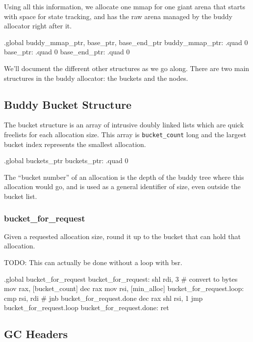 Using all this information, we allocate one mmap for one giant arena that
starts with space for state tracking, and has the raw arena managed by the
buddy allocator right after it.

\begin{asmdata}
.global buddy_mmap_ptr, base_ptr, base_end_ptr
buddy_mmap_ptr: .quad 0
base_ptr: .quad 0
base_end_ptr: .quad 0
\end{asmdata}

We'll document the different other structures as we go along.  There are two
main structures in the buddy allocator: the buckets and the nodes.

\subsection{Buddy Bucket Structure}

The bucket structure is an array of intrusive doubly linked lists which are
quick freelists for each allocation size. This array
is \lstinline|bucket_count| long and the largest bucket index represents the
smallest allocation.

\begin{asmdata}
.global buckets_ptr
buckets_ptr: .quad 0
\end{asmdata}

The ``bucket number'' of an allocation is the depth of the buddy tree where
this allocation would go, and is used as a general identifier of size, even
outside the bucket list.

\subsubsection{bucket\_for\_request}

Given a requested allocation size, round it up to the bucket that can hold that
allocation.

TODO: This can actually be done without a loop with bsr.

\begin{asm}
.global bucket_for_request
bucket_for_request:
	shl	rdi, 3		# convert to bytes
	mov	rax, [bucket_count]
	dec	rax
	mov	rsi, [min_alloc]
bucket_for_request.loop:
	cmp	rsi, rdi	#
	jnb	bucket_for_request.done
	dec	rax
	shl	rsi, 1
	jmp	bucket_for_request.loop
bucket_for_request.done:
	ret
\end{asm}

\subsection{GC Headers}

